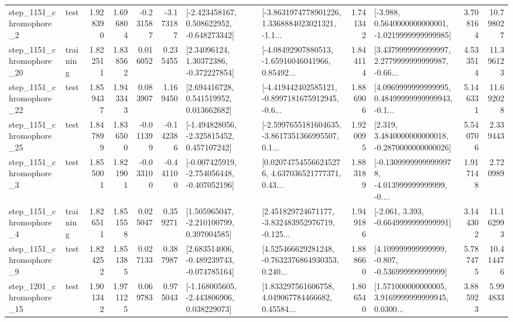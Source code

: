 \begin{tabular}{llrrrrllrlrr}
  step\_1151\_chromophore\_2 &      test &      1.928390 &    1.696804 &     -0.231587 & -3.173187 &   [-2.423458167, 0.508622952, -0.648273342] &  [-3.8631974778901226, 1.3368884023021321, -1.1... &       1.741342 &  [-3.988, 0.5640000000000001, -1.0219999999999985] &            3.708164 &         10.798027 \\
 step\_1151\_chromophore\_20 &  training &      1.822511 &    1.838562 &      0.016052 &  0.235455 &      [2.34096124, 1.30372386, -0.372227854] &  [-4.08492907880513, -1.65916046041966, 0.85492... &       1.844114 &  [3.4379999999999997, 2.2779999999999987, -0.66... &            4.533514 &         11.396123 \\
 step\_1151\_chromophore\_22 &      test &      1.859437 &    1.943343 &      0.083907 &  1.169450 &     [2.694416728, 0.541519952, 0.013662682] &  [-4.419442402585121, -0.8997181675912945, -0.6... &       1.886906 &  [4.0969999999999995, 0.48499999999999943, -0.1... &            5.146331 &         11.692028 \\
 step\_1151\_chromophore\_25 &      test &      1.847899 &    1.836500 &     -0.011399 & -0.142386 &   [-1.494828056, -2.325815452, 0.457107242] &  [-2.5997655181604635, -3.8617351366995507, 0.1... &       1.920095 &   [2.319, 3.4840000000000018, -0.2870000000000026] &            5.540706 &          2.339443 \\
  step\_1151\_chromophore\_3 &      test &      1.855001 &    1.821901 &     -0.033100 & -0.441100 &  [-0.007425919, -2.754056448, -0.407052196] &  [0.020747545566245276, 4.637036521777371, 0.43... &       1.883189 &  [-0.13099999999999978, -4.013999999999999, -0.... &            1.917148 &          2.720989 \\
  step\_1151\_chromophore\_4 &  training &      1.826511 &    1.851558 &      0.025047 &  0.359271 &    [1.505965047, -2.210100799, 0.397004585] &  [2.451829724671177, -3.832483952976719, -0.125... &       1.949186 &               [-2.061, 3.393, -0.6649999999999991] &            3.144302 &         11.162993 \\
  step\_1151\_chromophore\_9 &      test &      1.824252 &    1.851385 &      0.027133 &  0.387987 &   [2.683514006, -0.489239743, -0.074785164] &  [4.525466629281248, -0.7632376864930353, 0.240... &       1.888660 &    [4.109999999999999, -0.807, -0.536999999999999] &            5.787475 &         10.414476 \\
 step\_1201\_chromophore\_15 &      test &      1.901342 &    1.971125 &      0.069783 &  0.975043 &   [-1.168005605, -2.443806906, 0.038229073] &  [1.833297561606758, 4.049067784466682, 0.45584... &       1.806540 &  [1.571000000000005, 3.9169999999999945, 0.0300... &            3.885923 &          5.994833 \\

\end{tabular}
